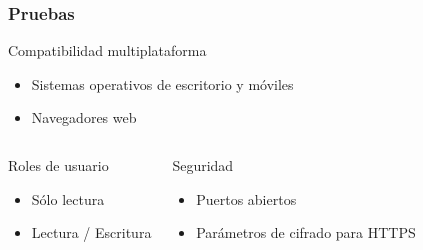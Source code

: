 \documentclass{beamer}
\begin{document}

\begin{frame}
\frametitle{Pruebas}
\justifying

\begin{block}{Compatibilidad multiplataforma}
 \begin{itemize}
  \item Sistemas operativos de escritorio y m\'{o}viles
  \item Navegadores web
 \end{itemize}
\end{block}

\begin{columns}[c] 

\begin{block}{Roles de usuario}
 \begin{itemize}
  \item S\'{o}lo lectura
  \item Lectura / Escritura
 \end{itemize}
\end{block}

\begin{block}{Seguridad}
 \begin{itemize}
  \item Puertos abiertos
  \item Par\'{a}metros de cifrado para \textup{HTTPS}
 \end{itemize}
\end{block}

\end{columns}

\end{frame}

%
% 
% 
%
% 
\end{document}
